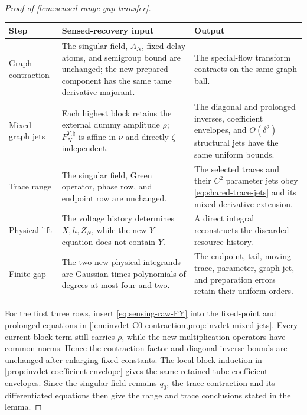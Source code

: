 \begin{proof}[Proof of \cref{lem:sensed-range-gap-transfer}]
\begin{center}
\small
\begin{tabular}{@{}L{.18\linewidth}L{.38\linewidth}L{.34\linewidth}@{}}
\toprule
Step & Sensed-recovery input & Output \\
\midrule
Graph contraction &
The singular field, \(A_N\), fixed delay atoms, and semigroup bound are
unchanged; the new prepared component has the same tame derivative
majorant. &
The special-flow transform contracts on the same graph ball.\\
Mixed graph jets &
Each highest block retains the external dummy amplitude \(\rho\);
\(F_N^{Y,\natural}\) is affine in \(\nu\) and directly
\(\zeta\)-independent. &
The diagonal and prolonged inverses, coefficient envelopes, and
\(O(\delta^2)\) structural jets have the same uniform bounds.\\
Trace range &
The singular field, Green operator, phase row, and endpoint row are
unchanged. &
The selected traces and their \(C^2\) parameter jets obey
\cref{eq:shared-trace-jets} and its mixed-derivative extension.\\
Physical lift &
The voltage history determines \(X,h,Z_N\), while the new \(Y\)-equation
does not contain \(Y\). &
A direct integral reconstructs the discarded resource history.\\
Finite gap &
The two new physical integrands are Gaussian times polynomials of degrees
at most four and two. &
The endpoint, tail, moving-trace, parameter, graph-jet, and preparation
errors retain their uniform orders.\\
\bottomrule
\end{tabular}
\end{center}

For the first three rows, insert \cref{eq:sensing-raw-FY} into the
fixed-point and prolonged equations in
\cref{lem:invdet-C0-contraction,prop:invdet-mixed-jets}.  Every
current-block term still carries \(\rho\), while the new multiplication
operators have common norms.  Hence the contraction factor and diagonal
inverse bounds are unchanged after enlarging fixed constants.  The local
block induction in \cref{prop:invdet-coefficient-envelope} gives the same
retained-tube coefficient envelopes.  Since the singular field remains
\(q_0\), the trace contraction and its differentiated equations then give
the range and trace conclusions stated in the lemma.


\end{proof}
